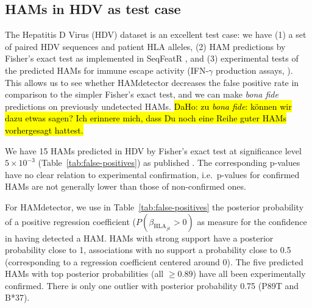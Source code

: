 \documentclass{bioinfo}
\begin{document}
\subsection{HAMs in HDV as test case}
The Hepatitis D Virus (HDV) dataset \citep{Karimzadeh2019} is an excellent test case: we have (1) a set of paired HDV sequences and patient HLA alleles, (2) HAM predictions by Fisher's exact test as implemented in SeqFeatR \citep{Budeus2016}, and (3) experimental tests of the predicted HAMs for immune escape activity (IFN-\(\gamma\) production assays, \citet{Karimzadeh2019}). This allows us to see whether HAMdetector decreases the false positive rate in comparison to the simpler Fisher's exact test, and we can make \emph{bona fide} predictions on previously undetected HAMs. \hl{DaHo: zu \emph{bona fide}: können wir dazu etwas sagen? Ich erinnere mich, dass Du noch eine Reihe guter HAMs vorhergesagt hattest.}

We have 15 HAMs predicted in HDV by Fisher's exact test at significance level $5\times 10^{-3}$ (Table~\ref{tab:false-positives}) as published \citep{Karimzadeh2019}. The corresponding p-values  have no clear relation to experimental confirmation, i.e.\ p-values for confirmed HAMs are not generally lower than those of non-confirmed ones.

For HAMdetector, we use in Table~\ref{tab:false-positives} the posterior probability of a positive regression coefficient ($P(\beta_{\text{HLA}_{jk}}>0)$ as measure for the confidence in having detected a HAM. HAMs with strong support have a posterior probability close to 1, associations with no support a probability close to 0.5 (corresponding to a regression coefficient centered around 0). The five predicted HAMs with top posterior probabilities (all $\ge 0.89$) have all been experimentally confirmed. There is only one outlier with posterior probability 0.75 (P89T and B*37).
\end{document}
